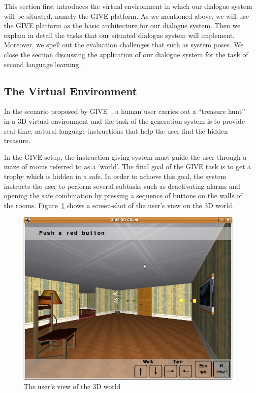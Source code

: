 This section first introduces the virtual environment in which our dialogue
system will be situated, namely the GIVE platform. As we mentioned above, we
will use the GIVE platform as the basic architecture for our dialogue system.  
Then we explain in detail the tasks that our situated dialogue system will
implement. Moreover, we spell out the evaluation challenges that such as system
poses. We close the section discussing the application of our dialogue system
for the task of second language learning. 

\subsection{The Virtual Environment}

In the scenario proposed by GIVE~\cite{byron09}, a
human user carries out a ``treasure hunt'' in a 3D virtual environment
and the task of the generation system is to provide real-time, natural
language instructions that help the user find the hidden treasure.

In the GIVE setup, the instruction giving system must guide the user
through a maze of rooms referred to as a `world'. The final
goal of the GIVE task is to get a trophy which is hidden in a safe. In
order to achieve this goal, the system instructs the user to perform
several subtasks such as deactivating alarms and opening the safe
combination by pressing a sequence of buttons on the walls of the
rooms. Figure~\ref{3d-world} shows a screen-shot of the user's view on
the 3D world.

\begin{figure}[h]
\begin{center}
\includegraphics[width=1\linewidth]{give-3D.jpg} 
\end{center}
\caption{The user's view of the 3D world\label{3d-world}}
\end{figure}

